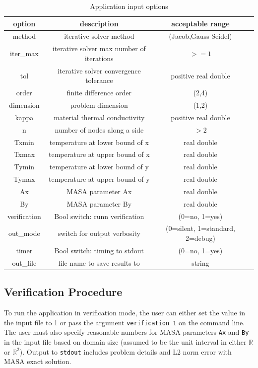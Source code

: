 \documentclass[letterpaper,12pt]{article}
\begin{document}
\begin{table}[h]
\label{tab:input}
\caption{Application input options}
\begin{center}
\begin{tabular}{| c | c | c | c | }
\hline
option & description & acceptable range  \\ \hline \hline
method & iterative solver method & (Jacob,Gauss-Seidel)  \\ \hline
iter\_max & iterative solver max number of iterations & $>=1$ \\ \hline
tol & iterative solver convergence tolerance & positive real double  \\ \hline
order & finite difference order & (2,4)  \\ \hline
dimension & problem dimension & (1,2)   \\ \hline
kappa & material thermal conductivity & positive real double  \\ \hline
n & number of nodes along a side & $>2$  \\ \hline
Txmin & temperature at lower bound of x & real double  \\ \hline
Txmax & temperature at upper bound of x & real double  \\ \hline
Tymin & temperature at lower bound of y & real double  \\ \hline
Tymax & temperature at upper bound of y & real double  \\ \hline
Ax & MASA parameter Ax & real double  \\ \hline
By & MASA parameter By & real double  \\ \hline
verification & Bool switch: runn verification & (0=no, 1=yes)  \\ \hline
out\_mode & switch for output verbosity & (0=silent, 1=standard, 2=debug)  \\ \hline
timer & Bool switch: timing to stdout & (0=no, 1=yes)  \\ \hline
out\_file & file name to save results to & string  \\ \hline
\end{tabular}
\end{center}
\end{table}

\subsection{Verification Procedure}
To run the application in verification mode, the user can either set the value in the input file to 1 or pass the argument \verb|verification 1| on the command line. The user must also specify reasonable numbers for MASA parameters \verb|Ax| and \verb|By| in the input file based on domain size (assumed to be the unit interval in either $\mathbb{R}$ or $\mathbb{R}^2$). Output to \verb|stdout| includes problem details and L2 norm error with MASA exact solution.
\end{document}
